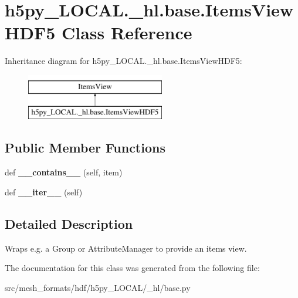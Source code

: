 \hypertarget{classh5py__LOCAL_1_1__hl_1_1base_1_1ItemsViewHDF5}{}\section{h5py\+\_\+\+L\+O\+C\+A\+L.\+\_\+hl.\+base.\+Items\+View\+H\+D\+F5 Class Reference}
\label{classh5py__LOCAL_1_1__hl_1_1base_1_1ItemsViewHDF5}
Inheritance diagram for h5py\+\_\+\+L\+O\+C\+A\+L.\+\_\+hl.\+base.\+Items\+View\+H\+D\+F5\+:\begin{figure}[H]
\begin{center}
\leavevmode
\includegraphics[height=2.000000cm]{classh5py__LOCAL_1_1__hl_1_1base_1_1ItemsViewHDF5}
\end{center}
\end{figure}
\subsection*{Public Member Functions}
\begin{DoxyCompactItemize}
\item 
\mbox{\label{classh5py__LOCAL_1_1__hl_1_1base_1_1ItemsViewHDF5_ae8e0543d4dcff61d5350826e27a30d6a}} 
def {\bfseries \+\_\+\+\_\+contains\+\_\+\+\_\+} (self, item)
\item 
\mbox{\label{classh5py__LOCAL_1_1__hl_1_1base_1_1ItemsViewHDF5_ad9985dbdd7dd844248bd3f01d63463b2}} 
def {\bfseries \+\_\+\+\_\+iter\+\_\+\+\_\+} (self)
\end{DoxyCompactItemize}


\subsection{Detailed Description}
\begin{DoxyVerb}    Wraps e.g. a Group or AttributeManager to provide an items view.
\end{DoxyVerb}
 

The documentation for this class was generated from the following file\+:\begin{DoxyCompactItemize}
\item 
src/mesh\+\_\+formats/hdf/h5py\+\_\+\+L\+O\+C\+A\+L/\+\_\+hl/base.\+py\end{DoxyCompactItemize}
